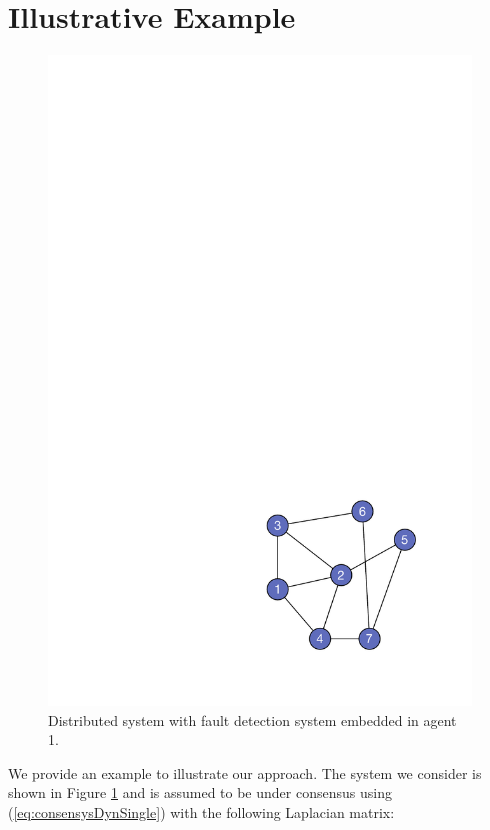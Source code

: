 \documentclass[letterpaper, 10 pt, conference]{ieeeconf}  %
\begin{document}
\section{Illustrative Example} \label{sec:Example}
\begin{figure}
    \centering
    \includegraphics[scale=0.3]{CCTA}
    \caption{Distributed system with fault detection system embedded in agent 1.}
    \label{fig:CCTA}
\end{figure}
We provide an example to illustrate our approach. The system we consider is shown in Figure \ref{fig:CCTA} and is assumed to be under consensus using (\ref{eq:consensysDynSingle}) with the following Laplacian matrix:
\begingroup\makeatletter\def\f@size{5}\check@mathfonts
\def\maketag@@@#1{\hbox{\m@th\large\normalfont#1}}%
\end{document}
